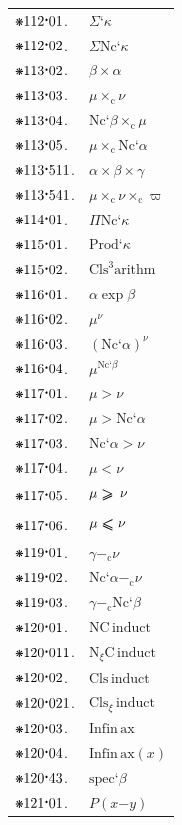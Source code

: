 \documentclass[12pt,openany,leqno,twocolumn]{book}
\newcommand{\pmast}{\text{\resizebox{!}{.75\height}{\ding{107}}}} %
\newcommand{\pmcdot}{\text{\raisebox{.05cm}{$\boldsymbol\cdot$}}} %
\newcommand{\pmClsn}[1]{\text{Cls}^{#1}}
\newcommand{\pmnc}[1]{\text{Nc}\textbf{`}#1} %
\newcommand{\pmNc}{\text{Nc}}
\newcommand{\pmarsumcc}[1]{\Sigma\textbf{`}#1} %
\newcommand{\pmarsumcnc}[1]{\Sigma\pmNc\textbf{`}#1} %
\newcommand{\pmarprodc}{\times} %
\newcommand{\pmarprodnc}{\times_\text{c}} %
\newcommand{\pmarprodcnc}[1]{\Pi\pmNc\textbf{`}#1} %
\newcommand{\pmarprodcc}[1]{\text{Prod}\textbf{`}#1} %
\newcommand{\pmarcls}{\pmClsn{3}\text{arithm}} %
\newcommand{\pmarexp}[2]{#1 \mathrel{\text{exp}} #2} %
\newcommand{\pmarncexp}[2]{#1^{#2}} %
\newcommand{\pmarg}{\mathrel{\boldsymbol{>}}} %
\newcommand{\pmarl}{\mathrel{\boldsymbol{<}}} %
\newcommand{\pmargeq}{\mathrel{\ooalign{$\boldsymbol{>}$\hidewidth\cr${\hspace{-.4ex}\raise-.75ex\hbox{\rotatebox[origin=c]{-155}{$\scalebox{1.1}{$\boldsymbol{-}$}$}}}$}}} %
\newcommand{\pmarleq}{\mathrel{\ooalign{$\boldsymbol{<}$\cr\hidewidth${\raise-.75ex\hbox{\rotatebox[origin=c]{155}{$\scalebox{1.1}{$\boldsymbol{-}$}$}}}\hspace{-.375ex}$}}} %
\newcommand{\pmarsubt}[2]{#1 \mathrel{{-}_\text{c}} #2} %
\newcommand{\pmNCinduct}{\text{NC}\,\text{induct}} %
\newcommand{\pmncinduct}[1]{\text{N}_#1\text{C}\,\text{induct}} %
\newcommand{\pmClsinduct}{\text{Cls}\,\text{induct}} %
\newcommand{\pmclsinduct}[1]{\text{Cls}_{#1}\,\text{induct}} %
\newcommand{\pmInfinax}{\text{Infin}\,\text{ax}} %
\newcommand{\pminfinax}[1]{\text{Infin}\,\text{ax}(#1)} %
\newcommand{\pmspec}[1]{\text{spec}\textbf{`}#1} %
\newcommand{\pmintoo}[2]{P(#1\mathbin{\boldsymbol{-}}#2)} %
\begin{document}
\begin{tabular}{l l}
	$\pmast112\pmcdot01$. & $\pmarsumcc{\kappa}$ \\
	$\pmast112\pmcdot02$. & $\pmarsumcnc{\kappa}$ \\
	$\pmast113\pmcdot02$. & $\beta \pmarprodc \alpha$ \\
	$\pmast113\pmcdot03$. & $\mu \pmarprodnc \nu$ \\
	$\pmast113\pmcdot04$. & $\pmnc{\beta} \pmarprodnc \mu$ \\
	$\pmast113\pmcdot05$. & $\mu \pmarprodnc \pmnc{\alpha}$ \\
	$\pmast113\pmcdot511$. & $\alpha \pmarprodc \beta \pmarprodc \gamma$ \\
	$\pmast113\pmcdot541$. & $\mu \pmarprodnc \nu \pmarprodnc \varpi$ \\
	$\pmast114\pmcdot01$. & $\pmarprodcnc{\kappa}$ \\
	$\pmast115\pmcdot01$. & $\pmarprodcc{\kappa}$ \\
	$\pmast115\pmcdot02$. & $\pmarcls$ \\
	$\pmast116\pmcdot01$. & $\pmarexp{\alpha}{\beta}$ \\
	$\pmast116\pmcdot02$. & $\pmarncexp{\mu}{\nu}$ \\
	$\pmast116\pmcdot03$. & $\pmarncexp{(\pmnc{\alpha})}{\nu}$ \\
	$\pmast116\pmcdot04$. & $\pmarncexp{\mu}{\pmnc{\beta}}$ \\
	$\pmast117\pmcdot01$. & $\mu \pmarg \nu$ \\
	$\pmast117\pmcdot02$. & $\mu \pmarg \pmnc{\alpha}$ \\
	$\pmast117\pmcdot03$. & $\pmnc{\alpha} \pmarg \nu$ \\
	$\pmast117\pmcdot04$. & $\mu \pmarl \nu$ \\
	$\pmast117\pmcdot05$. & $\mu \pmargeq \nu$ \\
	$\pmast117\pmcdot06$. & $\mu \pmarleq \nu$ \\
	$\pmast119\pmcdot01$. & $\pmarsubt{\gamma}{\nu}$ \\
	$\pmast119\pmcdot02$. & $\pmarsubt{\pmnc{\alpha}}{\nu}$ \\
	$\pmast119\pmcdot03$. & $\pmarsubt{\gamma}{\pmnc{\beta}}$ \\
	$\pmast120\pmcdot01$. & $\pmNCinduct$ \\
	$\pmast120\pmcdot011$. & $\pmncinduct{\xi}$ \\
	$\pmast120\pmcdot02$. & $\pmClsinduct$ \\
	$\pmast120\pmcdot021$. & $\pmclsinduct{\xi}$ \\
	$\pmast120\pmcdot03$. & $\pmInfinax$ \\
	$\pmast120\pmcdot04$. & $\pminfinax{x}$ \\
	$\pmast120\pmcdot43$. & $\pmspec{\beta}$ \\
	$\pmast121\pmcdot01$. & $\pmintoo{x}{y}$ 
\end{tabular}
\end{document}
